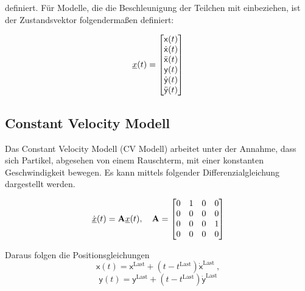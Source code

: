 definiert.
Für Modelle, die die Beschleunigung der Teilchen mit einbeziehen, ist der Zustandsvektor folgendermaßen definiert:

\begin{equation} \label{eq:definitionCA}
    {\underline{x}}(t) = 
    \begin{bmatrix}
        \mathsf{x}(t) \\
        \dot{\mathsf{x}}(t) \\
        \ddot{\mathsf{x}}(t) \\
        \mathsf{y}(t) \\
        \dot{\mathsf{y}}(t) \\
        \ddot{\mathsf{y}}(t)
       \end{bmatrix} 
\end{equation}


\subsection{Constant Velocity Modell}

Das Constant Velocity Modell (CV Modell) arbeitet unter der Annahme, dass sich Partikel, 
abgesehen von einem Rauschterm, mit einer konstanten Geschwindigkeit bewegen.
Es kann mittels folgender Differenzialgleichung dargestellt werden.

\begin{equation*} \label{eq:speedCV}
    \dot{{\underline{x}}}(t) = {{\mathbf{A}}}{\underline{x}}(t), \quad {\ensuremath{{\mathbf{A}}}} = 
    \begin{bmatrix}
        0 & 1 & 0 & 0 \\
        0 & 0 & 0 & 0 \\
        0 & 0 & 0 & 1\\
        0 & 0 & 0 & 0
    \end{bmatrix} 
\end{equation*}

Daraus folgen die Positionsgleichungen 
\begin{equation*}
    \mathsf{x}(t) = \mathsf{x}^{\text{Last}} + (t - t^{\text{Last}})\dot{\mathsf{x}}^{\text{Last}} \: ,
\end{equation*}
\begin{equation*}
    \mathsf{y}(t) = \mathsf{y}^{\text{Last}} + (t - t^{\text{Last}})\dot{\mathsf{y}}^{\text{Last}}
\end{equation*}

